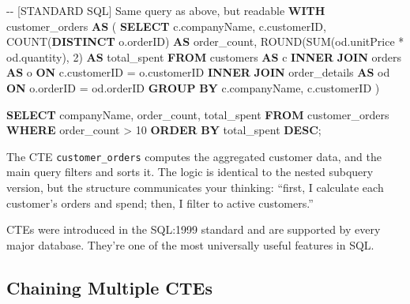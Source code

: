 \documentclass[
  letterpaper,
  DIV=11,
  numbers=noendperiod]{scrreprt}
\newenvironment{Shaded}{\begin{snugshade}}{\end{snugshade}}
\newcommand{\CommentTok}[1]{\textcolor[rgb]{0.37,0.37,0.37}{#1}}
\newcommand{\DecValTok}[1]{\textcolor[rgb]{0.68,0.00,0.00}{#1}}
\newcommand{\FunctionTok}[1]{\textcolor[rgb]{0.28,0.35,0.67}{#1}}
\newcommand{\KeywordTok}[1]{\textcolor[rgb]{0.00,0.23,0.31}{\textbf{#1}}}
\newcommand{\NormalTok}[1]{\textcolor[rgb]{0.00,0.23,0.31}{#1}}
\newcommand{\OperatorTok}[1]{\textcolor[rgb]{0.37,0.37,0.37}{#1}}
\begin{document}
\begin{codelisting}

\caption{\texttt{duckdb}}

\begin{Shaded}
\begin{Highlighting}[]
\CommentTok{{-}{-} [STANDARD SQL] Same query as above, but readable}
\KeywordTok{WITH}\NormalTok{ customer\_orders }\KeywordTok{AS}\NormalTok{ (}
    \KeywordTok{SELECT}
\NormalTok{        c.companyName,}
\NormalTok{        c.customerID,}
        \FunctionTok{COUNT}\NormalTok{(}\KeywordTok{DISTINCT}\NormalTok{ o.orderID) }\KeywordTok{AS}\NormalTok{ order\_count,}
        \FunctionTok{ROUND}\NormalTok{(}\FunctionTok{SUM}\NormalTok{(od.unitPrice }\OperatorTok{*}\NormalTok{ od.quantity), }\DecValTok{2}\NormalTok{) }\KeywordTok{AS}\NormalTok{ total\_spent}
    \KeywordTok{FROM}\NormalTok{ customers }\KeywordTok{AS}\NormalTok{ c}
    \KeywordTok{INNER} \KeywordTok{JOIN}\NormalTok{ orders }\KeywordTok{AS}\NormalTok{ o }\KeywordTok{ON}\NormalTok{ c.customerID }\OperatorTok{=}\NormalTok{ o.customerID}
    \KeywordTok{INNER} \KeywordTok{JOIN}\NormalTok{ order\_details }\KeywordTok{AS}\NormalTok{ od }\KeywordTok{ON}\NormalTok{ o.orderID }\OperatorTok{=}\NormalTok{ od.orderID}
    \KeywordTok{GROUP} \KeywordTok{BY}\NormalTok{ c.companyName, c.customerID}
\NormalTok{)}

\KeywordTok{SELECT}
\NormalTok{    companyName,}
\NormalTok{    order\_count,}
\NormalTok{    total\_spent}
\KeywordTok{FROM}\NormalTok{ customer\_orders}
\KeywordTok{WHERE}\NormalTok{ order\_count }\OperatorTok{\textgreater{}} \DecValTok{10}
\KeywordTok{ORDER} \KeywordTok{BY}\NormalTok{ total\_spent }\KeywordTok{DESC}\NormalTok{;}
\end{Highlighting}
\end{Shaded}

\end{codelisting}

The CTE \texttt{customer\_orders} computes the aggregated customer data,
and the main query filters and sorts it. The logic is identical to the
nested subquery version, but the structure communicates your thinking:
``first, I calculate each customer's orders and spend; then, I filter to
active customers.''

CTEs were introduced in the SQL:1999 standard and are supported by every
major database. They're one of the most universally useful features in
SQL.

\subsection{Chaining Multiple CTEs}\label{chaining-multiple-ctes}
\end{document}
